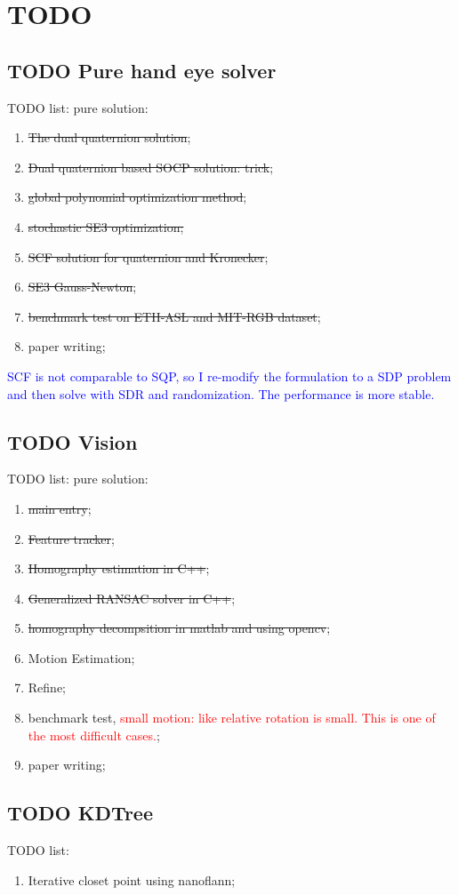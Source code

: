 \documentclass[a4paper]{report}
\begin{document}
\chapter{TODO}
\section{TODO Pure hand eye solver}
TODO list:
pure solution:
\begin{enumerate}
	\item \sout{The dual quaternion solution};
	\item \sout{Dual quaternion based SOCP solution: trick};
	\item \sout{global polynomial optimization method};
	\item \sout{stochastic SE3 optimization;}
	\item \sout{SCF solution for quaternion and Kronecker};
	\item \sout{SE3 Gauss-Newton};
	\item \sout{benchmark test on ETH-ASL and MIT-RGB dataset};
	\item paper writing;
\end{enumerate}
\textcolor{blue}{SCF is not comparable to SQP, so I re-modify the formulation to a SDP problem and then solve with SDR and randomization. The performance is more stable.}


\section{TODO Vision}
TODO list:
pure solution:
\begin{enumerate}
	\item \sout{main entry};
	\item \sout{Feature tracker};
	\item \sout{Homography estimation in C++};
	\item \sout{Generalized RANSAC solver in C++};
	\item \sout{homography decompsition in matlab and using opencv};
	\item Motion Estimation;
	\item Refine;
	\item benchmark test, \textcolor{red}{small motion: like relative rotation is small. This is one of the most difficult cases.};
	\item paper writing;
\end{enumerate}

\section{TODO KDTree}
TODO list:
\begin{enumerate}
\item Iterative closet point using nanoflann;
\end{enumerate}
\end{document}
